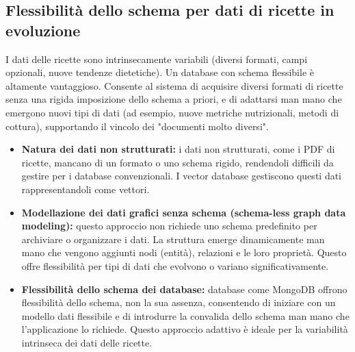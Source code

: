 \documentclass[a4paper, 11pt]{article}
\begin{document}
\subsection{Flessibilità dello schema per dati di ricette in evoluzione}
I dati delle ricette sono intrinsecamente variabili (diversi formati, campi opzionali, nuove tendenze dietetiche). Un database con schema flessibile è altamente vantaggioso. Consente al sistema di acquisire diversi formati di ricette senza una rigida imposizione dello schema a priori, e di adattarsi man mano che emergono nuovi tipi di dati (ad esempio, nuove metriche nutrizionali, metodi di cottura), supportando il vincolo dei "documenti molto diversi".
\begin{itemize}
    \item \textbf{Natura dei dati non strutturati:} i dati non strutturati, come i PDF di ricette, mancano di un formato o uno schema rigido, rendendoli difficili da gestire per i database convenzionali. \cite{qdrant_vector_db} I vector database gestiscono questi dati rappresentandoli come vettori. \cite{qdrant_vector_db}
    \item \textbf{Modellazione dei dati grafici senza schema (schema-less graph data modeling):} questo approccio non richiede uno schema predefinito per archiviare o organizzare i dati. La struttura emerge dinamicamente man mano che vengono aggiunti nodi (entità), relazioni e le loro proprietà. \cite{schemaless_graph_modeling} Questo offre flessibilità per tipi di dati che evolvono o variano significativamente.
    \item \textbf{Flessibilità dello schema dei database:} database come MongoDB offrono flessibilità dello schema, non la sua assenza, consentendo di iniziare con un modello dati flessibile e di introdurre la convalida dello schema man mano che l'applicazione lo richiede. \cite{mongodb_flexible_schema} Questo approccio adattivo è ideale per la variabilità intrinseca dei dati delle ricette.
\end{itemize}
\end{document}
